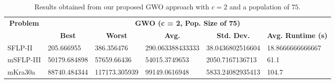 \begin{table}[h!]
	\begin{adjustwidth}{-1.18in}{}
		\centering
		\begin{tabular}{|l|l|l|l|l|l|}
			\hline
			\multicolumn{1}{|c|}{\multirow{2}{*}{\textbf{Problem}}} & \multicolumn{5}{c|}{\textbf{GWO (c = 2, Pop. Size of 75)}} \\ \cline{2-6} 
			\multicolumn{1}{|c|}{}                                  & \multicolumn{1}{c|}{\textbf{Best}} & \multicolumn{1}{c|}{\textbf{Worst}} & \multicolumn{1}{c|}{\textbf{Avg.}} & \multicolumn{1}{c|}{\textbf{Std. Dev.}} & \multicolumn{1}{c|}{\textbf{Avg. Runtime (s)}} \\ \hline
			SFLP-II                                                 & 205.666955                                  & 386.356476                                   & 290.063388433333                      & 38.0436802516604                                 & 18.8666666666667                                  \\ \hline
			mSFLP-III                                               & 50179.684898                                & 57659.66436                                 & 54015.3749653						         & 2050.7167136713                              & 61.1                               \\ \hline
			mKra30a                                               & 88740.484344                                & 117173.305939                                 &
			99149.0616948							&
			5833.24082935413							&
			104.7						\\ \hline
		\end{tabular}
	\end{adjustwidth}
	\caption{Results obtained from our proposed GWO approach with $c = 2$ and a population of $75$.}
	\label{approach-gwo-c2-p75-results}
\end{table}

